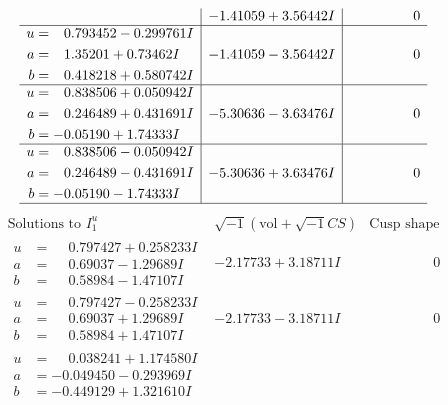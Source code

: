 \documentclass[1p]{elsarticle_modified}
\theoremstyle{definition}
\newcommand{\I}{\sqrt{-1}}
\begin{document}
$$\begin{array}{c|c|c}
 & -1.41059 + 3.56442 I & \phantom{-0.000000 } 0 \\ \hline\begin{aligned}
u &= \phantom{-}0.793452 - 0.299761 I \\
a &= \phantom{-}1.35201 + 0.73462 I \\
b &= \phantom{-}0.418218 + 0.580742 I\end{aligned}
 & -1.41059 - 3.56442 I & \phantom{-0.000000 } 0 \\ \hline\begin{aligned}
u &= \phantom{-}0.838506 + 0.050942 I \\
a &= \phantom{-}0.246489 + 0.431691 I \\
b &= -0.05190 + 1.74333 I\end{aligned}
 & -5.30636 - 3.63476 I & \phantom{-0.000000 } 0 \\ \hline\begin{aligned}
u &= \phantom{-}0.838506 - 0.050942 I \\
a &= \phantom{-}0.246489 - 0.431691 I \\
b &= -0.05190 - 1.74333 I\end{aligned}
 & -5.30636 + 3.63476 I & \phantom{-0.000000 } 0\\
 \hline 
 \end{array}$$\newpage$$\begin{array}{c|c|c}  
\text{Solutions to }I^u_{1}& \I (\text{vol} + \sqrt{-1}CS) & \text{Cusp shape}\\
 \hline 
\begin{aligned}
u &= \phantom{-}0.797427 + 0.258233 I \\
a &= \phantom{-}0.69037 - 1.29689 I \\
b &= \phantom{-}0.58984 - 1.47107 I\end{aligned}
 & -2.17733 + 3.18711 I & \phantom{-0.000000 } 0 \\ \hline\begin{aligned}
u &= \phantom{-}0.797427 - 0.258233 I \\
a &= \phantom{-}0.69037 + 1.29689 I \\
b &= \phantom{-}0.58984 + 1.47107 I\end{aligned}
 & -2.17733 - 3.18711 I & \phantom{-0.000000 } 0 \\ \hline\begin{aligned}
u &= \phantom{-}0.038241 + 1.174580 I \\
a &= -0.049450 - 0.293969 I \\
b &= -0.449129 + 1.321610 I\end{aligned}

\end{array}$$
\end{document}
